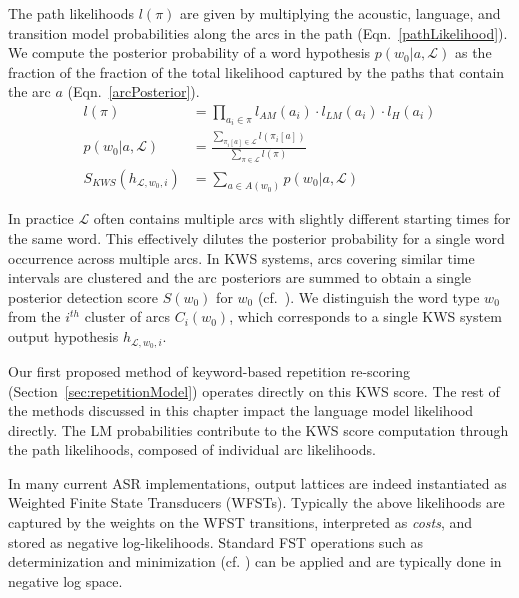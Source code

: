 The path likelihoods $l(\pi)$ are given by multiplying the acoustic, language, and transition model probabilities along the arcs in the path (Eqn.~\ref{pathLikelihood}).  We compute the posterior probability of a word hypothesis $p(w_0|a,\mathcal{L})$ as the fraction of the fraction of the total likelihood captured by the paths that contain the arc $a$ (Eqn.~\ref{arcPosterior}).
\begin{align}
l(\pi) &= \prod_{a_i \in \pi} l_{AM}(a_i) \cdot l_{LM}(a_i) \cdot l_{H}(a_i) \label{pathLikelihood} \\[1ex]
p(w_0|a,\mathcal{L}) &= \frac{\sum_{\pi_i[a] \in \mathcal{L}}l(\pi_i[a])}{\sum_{\pi \in \mathcal{L}} l(\pi)} \label{arcPosterior} \\[1ex]
S_{KWS}(h_{\mathcal{L},w_0,i}) &= \sum_{a \in A(w_0)} p(w_0|a,\mathcal{L}) \label{kwsScore}
\end{align} 
\vskip0.2cm

In practice $\mathcal{L}$ often contains multiple arcs with slightly different starting times for the same word.  This effectively dilutes the posterior probability for a single word occurrence across multiple arcs.  In KWS systems, arcs covering similar time intervals are clustered and the arc posteriors are summed to obtain a single posterior detection score $S(w_0)$ for $w_0$ (cf.~\cite{miller2007rapid}).  We distinguish the word type $w_0$ from the $i^{th}$ cluster of arcs $C_i(w_0)$, which corresponds to a single KWS system output hypothesis $h_{\mathcal{L},w_0,i}$.

Our first proposed method of keyword-based repetition re-scoring (Section~\ref{sec:repetitionModel}) operates directly on this KWS score. The rest of the methods discussed in this chapter impact the language model likelihood directly.  The LM probabilities contribute to the KWS score computation through the path likelihoods, composed of individual arc likelihoods.

In many current ASR implementations, output lattices are indeed instantiated as Weighted Finite State Transducers (WFSTs). Typically the above likelihoods are captured by the weights on the WFST transitions, interpreted as \textit{costs}, and stored as negative log-likelihoods.  Standard FST operations such as determinization and minimization (cf. \cite{mohri2002weighted}) can be applied and are typically done in negative log space.

